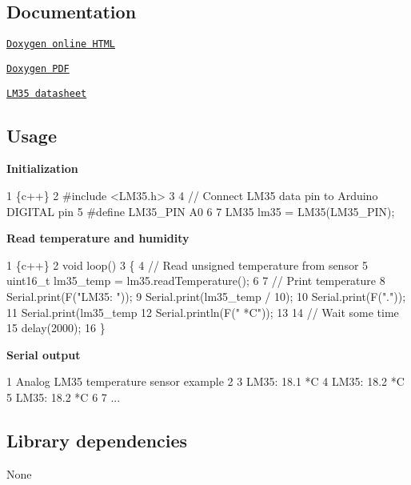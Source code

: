 \subsection*{Documentation}


\begin{DoxyItemize}
\item \href{https://erriez.github.io/ErriezLM35}{\tt Doxygen online H\+T\+ML}
\item \href{https://github.com/Erriez/ErriezLM35/raw/gh-pages/latex/ErriezLM35.pdf}{\tt Doxygen P\+DF}
\item \href{https://www.google.com/search?q=LM35+datasheet}{\tt L\+M35 datasheet}
\end{DoxyItemize}

\subsection*{Usage}

{\bfseries Initialization}


\begin{DoxyCode}
1 \{c++\}
2 #include <LM35.h>
3 
4 // Connect LM35 data pin to Arduino DIGITAL pin
5 #define LM35\_PIN   A0
6 
7 LM35 lm35 = LM35(LM35\_PIN);
\end{DoxyCode}


{\bfseries Read temperature and humidity}


\begin{DoxyCode}
1 \{c++\}
2 void loop()
3 \{
4   // Read unsigned temperature from sensor
5   uint16\_t lm35\_temp = lm35.readTemperature();
6 
7   // Print temperature
8   Serial.print(F("LM35: "));
9   Serial.print(lm35\_temp / 10);
10   Serial.print(F("."));
11   Serial.print(lm35\_temp %
12   Serial.println(F(" *C"));
13 
14   // Wait some time
15   delay(2000);
16 \}
\end{DoxyCode}


{\bfseries Serial output}


\begin{DoxyCode}
1 Analog LM35 temperature sensor example
2 
3 LM35: 18.1 *C
4 LM35: 18.2 *C
5 LM35: 18.2 *C
6 
7 ...
\end{DoxyCode}


\subsection*{Library dependencies}


\begin{DoxyItemize}
\item None
\end{DoxyItemize}

